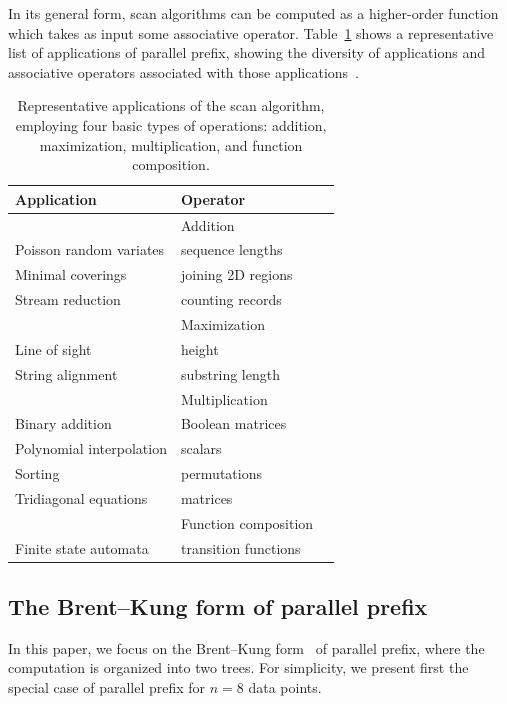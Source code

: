 \documentclass{sig-alternate}
\begin{document}
In its general form, scan algorithms can be computed as a higher-order function
which takes as input some associative operator. Table~\ref{tab:prefixapps}
shows a representative list of applications of parallel prefix, showing the
diversity of applications and associative operators associated with those
applications~\cite{Blelloch1990,Blelloch1993}.

\begin{table}
	\begin{tabular}{l l l}
		\hline
		Application              & Operator                  \\ \hline
		                         & Addition\\
		Poisson random variates \cite{Lu1996} & sequence lengths \\
		Minimal coverings \cite{Moitra1991}   & joining 2D regions \\
		Stream reduction \cite{Horn2005}      & counting records \\ \hline
	                                 & Maximization\\
		Line of sight \cite{Blelloch1990}          & height\\
		String alignment \cite{Hillis1986,Chi1992} & substring length\\ \hline
					 & Multiplication\\
		Binary addition \cite{Sklansky1960} 	      & Boolean matrices\\
		Polynomial interpolation \cite{Egecioglu1990} & scalars\\
		Sorting	\cite{Hillis1986,Blelloch1989} 		 & permutations\\ \hline
		Tridiagonal equations  \cite{Mathias1995}     & matrices\\
					 & Function composition & \\
		Finite state automata \cite{Ladner1980,Hillis1986}  & transition functions\\ \hline
	\end{tabular}
	\caption{Representative applications of the scan algorithm, employing
	four basic types of operations: addition, maximization, multiplication,
	and function composition.}
	\label{tab:prefixapps}
\end{table}

\subsection{The Brent--Kung form of parallel prefix}

In this paper, we focus on the Brent--Kung form~\cite{Brent1982} of parallel
prefix, where the computation is organized into two trees. For simplicity, we
present first the special case of parallel prefix for $n=8$ data points.
\end{document}
